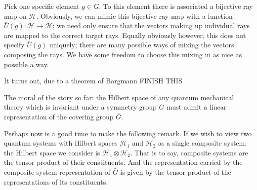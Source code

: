 \documentclass[a4paper,10pt]{scrreprt}
\theoremstyle{definition}
\theoremstyle{plain}
\theoremstyle{remark}
\begin{document}
Pick one specific element $g \in G$. To this element there is associated a bijective ray map on $\mathscr{H}$. Obviously, we can mimic this bijective ray map with a function $\bar{U}(g)\colon \mathscr{H} \to \mathscr{H}$; we need only ensure that the vectors making up individual rays are mapped to the correct target rays. Equally obviously however, this does not specify $\bar{U}(g)$ uniquely; there are many possible ways of mixing the vectors composing the rays. We have some freedom to choose this mixing in as nice as possible a way.

It turns out, due to a theorem of Bargmann {\color{red}FINISH THIS}

% 
% 
% 

The moral of the story so far: the Hilbert space of any quantum mechanical theory which is invariant under a symmetry group $G$ must admit a linear representation of the covering group $\bar{G}$.

Perhaps now is a good time to make the following remark. If we wish to view two quantum systems with Hilbert spaces $\mathscr{H}_{1}$ and $\mathscr{H}_{2}$ as a single composite system, the Hilbert space we consider is $\mathscr{H}_{1} \otimes \mathscr{H}_{2}$. That is to say, composite systems are the tensor product of their constituents. And the representation carried by the composite system representation of $\bar{G}$ is given by the tensor product of the representations of its constituents.
\end{document}
